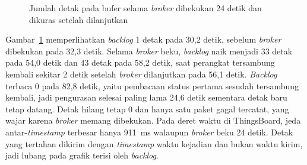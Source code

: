 \begin{figure}[!ht]
  \centering
  \caption{Jumlah detak pada bufer selama \textit{broker} dibekukan 24 detik dan dikuras setelah dilanjutkan}
  \label{fig:4-bufer}
\end{figure}

Gambar~\ref{fig:4-bufer} memperlihatkan \textit{backlog} 1 detak pada 30,2 detik, sebelum \textit{broker} dibekukan pada 32,3 detik. Selama \textit{broker} beku, \textit{backlog} naik menjadi 33 detak pada 54,0 detik dan 43 detak pada 58,2 detik, saat perangkat tersambung kembali sekitar 2 detik setelah \textit{broker} dilanjutkan pada 56,1 detik. \textit{Backlog} terbaca 0 pada 82,8 detik, yaitu pembacaan status pertama sesudah tersambung kembali, jadi pengurasan selesai paling lama 24,6 detik sementara detak baru tetap datang. Detak hilang tetap 0 dan hanya satu paket gagal tercatat, yang wajar karena \textit{broker} memang dibekukan. Pada deret waktu di ThingsBoard, jeda antar-\textit{timestamp} terbesar hanya 911~ms walaupun \textit{broker} beku 24 detik. Detak yang tertahan dikirim dengan \textit{timestamp} waktu kejadian dan bukan waktu kirim, jadi lubang pada grafik terisi oleh \textit{backlog}.

